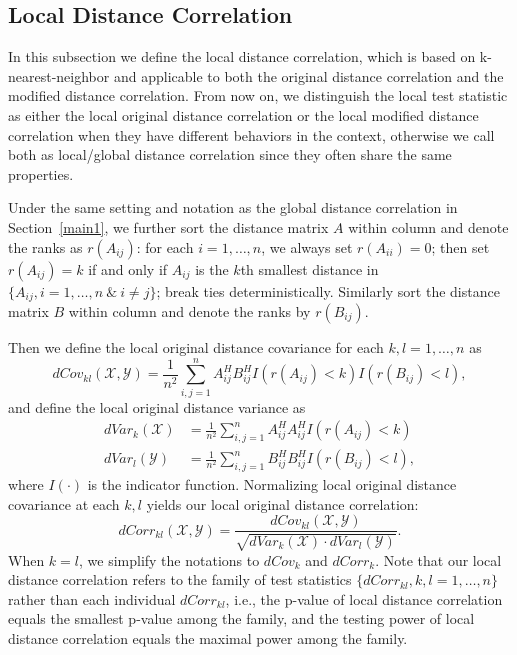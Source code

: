 \documentclass[12pt]{article}
\begin{document}
\subsection{Local Distance Correlation}
\label{main2}
In this subsection we define the local distance correlation, which is based on k-nearest-neighbor and applicable to both the original distance correlation and the modified distance correlation. From now on, we distinguish the local test statistic as either the local original distance correlation or the local modified distance correlation when they have different behaviors in the context, otherwise we call both as local/global distance correlation since they often share the same properties.

Under the same setting and notation as the global distance correlation in Section~\ref{main1}, we further sort the distance matrix $A$ within column and denote the ranks as $r(A_{ij})$: for each $i=1, \ldots, n$, we always set $r(A_{ii})=0$; then set $r(A_{ij})=k$ if and only if $A_{ij}$ is the $k$th smallest distance in $\{A_{ij}, i=1,\ldots,n\ \& \ i \neq j\}$; break ties deterministically. Similarly sort the distance matrix $B$ within column and denote the ranks by $r(B_{ij})$.

Then we define the local original distance covariance for each $k,l=1,\ldots,n$ as
\begin{equation}
\label{localdCovEqu}
dCov_{kl}(\mathcal{X},\mathcal{Y})=\frac{1}{n^2}\sum_{i,j=1}^{n}A^{H}_{ij}B^{H}_{ij}I(r(A_{ij})<k)I(r(B_{ij})<l),
\end{equation}
and define the local original distance variance as
\begin{align*}
dVar_{k}(\mathcal{X}) &=\frac{1}{n^2}\sum_{i,j=1}^{n}A^{H}_{ij}A^{H}_{ij}I(r(A_{ij})<k)\\
dVar_{l}(\mathcal{Y}) &=\frac{1}{n^2}\sum_{i,j=1}^{n}B^{H}_{ij}B^{H}_{ij}I(r(B_{ij})<l),
\end{align*}
where $I(\cdot)$ is the indicator function. Normalizing local original distance covariance at each $k,l$ yields our local original distance correlation:
\begin{equation}
\label{localdCorrEqu}
dCorr_{kl}(\mathcal{X},\mathcal{Y})=\frac{dCov_{kl}(\mathcal{X},\mathcal{Y})}{\sqrt{dVar_{k}(\mathcal{X}) \cdot dVar_{l}(\mathcal{Y})}}.
\end{equation}
When $k=l$, we simplify the notations to $dCov_{k}$ and $dCorr_{k}$. Note that our local distance correlation refers to the family of test statistics $\{dCorr_{kl}, k,l=1,\ldots,n\}$ rather than each individual $dCorr_{kl}$, i.e., the p-value of local distance correlation equals the smallest p-value among the family, and the testing power of local distance correlation equals the maximal power among the family.
\end{document}
